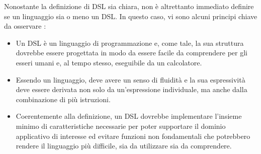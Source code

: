 \documentclass[12pt,a4paper,openright,twoside]{book}
\begin{document}
Nonostante la definizione di \ac{DSL} sia chiara, non è altrettanto immediato definire se un linguaggio sia o meno un \ac{DSL}. In questo caso, 
vi sono alcuni principi chiave da osservare \cite{Fowler2010}:
\begin{itemize}
    \item Un \ac{DSL} è un linguaggio di programmazione e, come tale, la sua struttura dovrebbe essere progettata in modo da essere facile da 
    comprendere per gli esseri umani e, al tempo stesso, eseguibile da un calcolatore.
    \item Essendo un linguaggio, deve avere un senso di fluidità e la sua espressività deve essere derivata non solo da un’espressione 
    individuale, ma anche dalla combinazione di più istruzioni.
    \item Coerentemente alla definizione, un \ac{DSL} dovrebbe implementare l'insieme minimo di caratteristiche necessarie per poter supportare 
    il dominio applicativo di interesse ed evitare funzioni non fondamentali che potrebbero rendere il linguaggio più difficile, 
    sia da utilizzare sia da comprendere.
\end{itemize}
\end{document}
